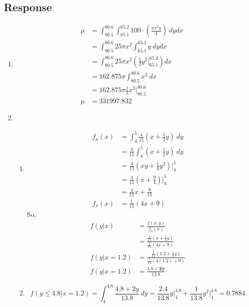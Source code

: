 \documentclass[13pt]{article}
\begin{document}
\subsection*{Response}
\begin{enumerate}[label=(\arabic*)]
\item 
  \begin{align*}
    \mu &= \int_{80.5}^{80.6}\int_{65.1}^{65.2} 100 \cdot
          \left( \frac{\pi x^2 y}{4} \right) \ dydx \\
        &= \int_{80.5}^{80.6} 25\pi x^2 \int_{65.1}^{65.2} y \ dydx \\
        &= \int_{80.5}^{80.6} 25\pi x^2 \left( \frac{1}{2}y^2
          \biggr\rvert_{65.1}^{65.2} \right)dx \\
        &= 162.875\pi \int_{80.5}^{80.6} x^2 \ dx \\
        &= 162.875\pi \frac{1}{3} x^3 \biggr\rvert_{80.5}^{80.6} \\
    \mu &= \pmb{331997.832}
  \end{align*}
  
\item
  \begin{enumerate}[label=(\roman*)]
  \item
    \begin{align*}
      f_x(x)
      &= \int_{4}^{5} \frac{4}{15} \left( x + \frac{1}{2} y \right) \ dy \\
      &= \frac{4}{15} \int_{4}^{5} \left( x + \frac{1}{2} y \right) \ dy \\
      &= \frac{4}{15} \left( xy + \frac{1}{4} y^2 \right) \biggr\rvert_{4}^{5} \\
      &= \frac{4}{15} \left( x + \frac{9}{4} \right) \biggr\rvert_{4}^{5} \\
      &= \frac{4}{15}x + \frac{9}{15} \\
      f_x(x) &= \frac{1}{15} \left( 4x + 9 \right)
    \end{align*}
    So,
    \begin{align*}
      f(y | x) &= \frac{f(x, y)}{f_x(x)} \\
               &= \frac{\frac{4}{15} \left( x + \frac{1}{2}y \right)}
                 {\frac{1}{15} \left( 4x + 9 \right)} \\
      f(y | x = 1.2) &= \frac{\frac{4}{15} \left( 1.2 + \frac{1}{2}y \right)}
                       {\frac{1}{15} \left( 4(1.2) + 9 \right)} \\
      f(y | x = 1.2) &= \pmb{\frac{4.8 + 2y}{13.8}}
    \end{align*}
    
  \item \[f(y \leq 4.8 | x = 1.2) = \int_{4}^{4.8} \frac{4.8 + 2y}{13.8} \ dy
      = \frac{2.4}{13.8}y \biggr\rvert_{4}^{4.8} + \frac{1}{13.8}y^2 \biggr\rvert_{4}^{4.8} = \pmb{0.7884}\]
  \end{enumerate}
\end{enumerate}
\end{document}
